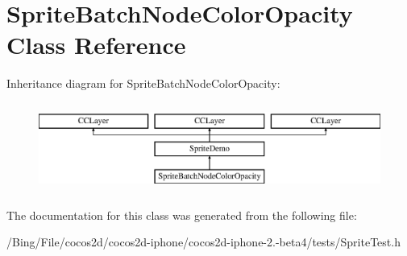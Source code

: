 \hypertarget{interface_sprite_batch_node_color_opacity}{\section{Sprite\-Batch\-Node\-Color\-Opacity Class Reference}
\label{interface_sprite_batch_node_color_opacity}
}
Inheritance diagram for Sprite\-Batch\-Node\-Color\-Opacity\-:\begin{figure}[H]
\begin{center}
\leavevmode
\includegraphics[height=2.947368cm]{interface_sprite_batch_node_color_opacity}
\end{center}
\end{figure}


The documentation for this class was generated from the following file\-:\begin{DoxyCompactItemize}
\item 
/\-Bing/\-File/cocos2d/cocos2d-\/iphone/cocos2d-\/iphone-\/2.-\/beta4/tests/Sprite\-Test.\-h\end{DoxyCompactItemize}
